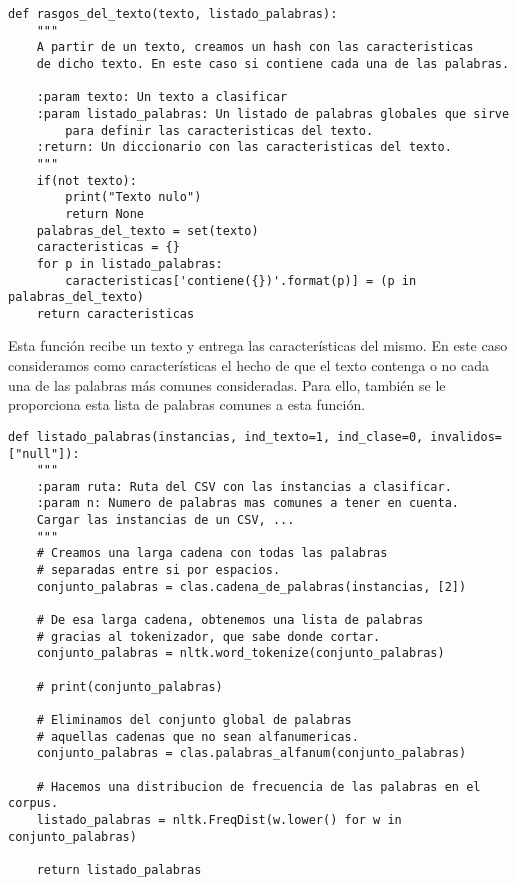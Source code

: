 \begin{center}
\begin{minipage}{\linewidth}
\begin{lstlisting}[caption=Función que extrae las características de un texto.]
def rasgos_del_texto(texto, listado_palabras):
    """
    A partir de un texto, creamos un hash con las caracteristicas
    de dicho texto. En este caso si contiene cada una de las palabras.

    :param texto: Un texto a clasificar
    :param listado_palabras: Un listado de palabras globales que sirve
        para definir las caracteristicas del texto.
    :return: Un diccionario con las caracteristicas del texto.
    """
    if(not texto):
        print("Texto nulo")
        return None
    palabras_del_texto = set(texto)
    caracteristicas = {}
    for p in listado_palabras:
        caracteristicas['contiene({})'.format(p)] = (p in palabras_del_texto)
    return caracteristicas
\end{lstlisting}
\end{minipage}
\end{center}

Esta función recibe un texto y entrega las características del mismo. En este caso consideramos como características el hecho de que el texto contenga o no cada una de las palabras más comunes consideradas. Para ello, también se le proporciona esta lista de palabras comunes a esta función.

\begin{center}
\begin{minipage}{\linewidth}
\begin{lstlisting}[caption=Función que retorna un listado de las palabras comunes.]
def listado_palabras(instancias, ind_texto=1, ind_clase=0, invalidos=["null"]):
    """
    :param ruta: Ruta del CSV con las instancias a clasificar.
    :param n: Numero de palabras mas comunes a tener en cuenta.
    Cargar las instancias de un CSV, ...
    """
    # Creamos una larga cadena con todas las palabras
    # separadas entre si por espacios.
    conjunto_palabras = clas.cadena_de_palabras(instancias, [2])

    # De esa larga cadena, obtenemos una lista de palabras
    # gracias al tokenizador, que sabe donde cortar.
    conjunto_palabras = nltk.word_tokenize(conjunto_palabras)

    # print(conjunto_palabras)

    # Eliminamos del conjunto global de palabras
    # aquellas cadenas que no sean alfanumericas.
    conjunto_palabras = clas.palabras_alfanum(conjunto_palabras)

    # Hacemos una distribucion de frecuencia de las palabras en el corpus.
    listado_palabras = nltk.FreqDist(w.lower() for w in conjunto_palabras)

    return listado_palabras
\end{lstlisting}
\end{minipage}
\end{center}

